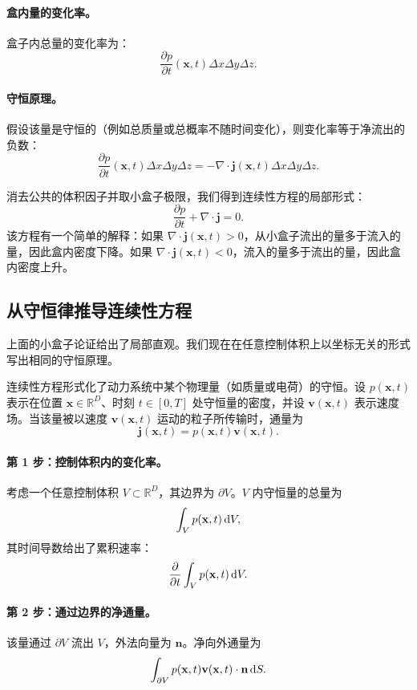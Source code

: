 \paragraph{盒内量的变化率。}
盒子内总量的变化率为：
\[
\frac{\partial p}{\partial t}(\mathbf{x}, t) \Delta x \Delta y \Delta z.
\]

\paragraph{守恒原理。}
假设该量是守恒的（例如总质量或总概率不随时间变化），则变化率等于净流出的负数：
\[
\frac{\partial p}{\partial t}(\mathbf{x}, t) \Delta x \Delta y \Delta z = - \nabla \cdot \mathbf{j}(\mathbf{x}, t) \Delta x \Delta y \Delta z.
\]

消去公共的体积因子并取小盒子极限，我们得到连续性方程的局部形式：
\[
\frac{\partial p}{\partial t} + \nabla \cdot \mathbf{j} = 0.
\]
该方程有一个简单的解释：如果 $\nabla\cdot\mathbf{j}(\mathbf{x},t)>0$，从小盒子流出的量多于流入的量，因此盒内密度下降。如果 $\nabla\cdot\mathbf{j}(\mathbf{x},t)<0$，流入的量多于流出的量，因此盒内密度上升。


\subsection{从守恒律推导连续性方程}

上面的小盒子论证给出了局部直观。我们现在在任意控制体积上以坐标无关的形式写出相同的守恒原理。

连续性方程形式化了动力系统中某个物理量（如质量或电荷）的守恒。设 $p(\mathbf{x}, t)$ 表示在位置 $\mathbf{x} \in \mathbb{R}^D$、时刻 $t \in [0, T]$ 处守恒量的密度，并设 $\mathbf{v}(\mathbf{x}, t)$ 表示速度场。当该量被以速度 $\mathbf{v}(\mathbf{x},t)$ 运动的粒子所传输时，通量为
\[
\mathbf{j}(\mathbf{x},t)=p(\mathbf{x},t)\mathbf{v}(\mathbf{x},t).
\]

\paragraph{第 1 步：控制体积内的变化率。}  
考虑一个任意控制体积 $V \subset \mathbb{R}^D$，其边界为 $\partial V$。$V$ 内守恒量的总量为
\[
\int_V p(\mathbf{x}, t) \mathop{}\!\mathrm{d} V,
\]
其时间导数给出了累积速率：
\[
\frac{\partial}{\partial t} \int_V p(\mathbf{x}, t) \mathop{}\!\mathrm{d} V.
\]

\paragraph{第 2 步：通过边界的净通量。}  
该量通过 $\partial V$ 流出 $V$，外法向量为 $\mathbf{n}$。净向外通量为
\[
\int_{\partial V} p(\mathbf{x}, t) \mathbf{v}(\mathbf{x}, t) \cdot \mathbf{n} \mathop{}\!\mathrm{d} S.
\]

